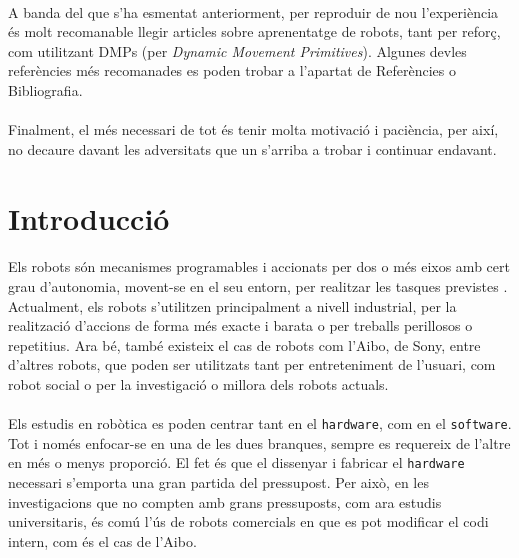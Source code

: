 \documentclass[12pt,a4paper,final,twoside]{article}
\begin{document}
\paragraph{}A banda del que s'ha esmentat anteriorment, per reproduir de nou l'experiència és molt recomanable llegir articles sobre aprenentatge de robots, tant per reforç, com utilitzant DMPs (per \textit{Dynamic Movement Primitives}). Algunes devles referències més recomanades es poden trobar a l'apartat de Referències o Bibliografia.

\paragraph{}Finalment, el més necessari de tot és tenir molta motivació i paciència, per així, no decaure davant les adversitats que un s'arriba a trobar i continuar endavant.

\newpage
\label{Introduccio}
\section{Introducció}

\paragraph{}Els robots són mecanismes programables i accionats per dos o més eixos amb cert grau d'autonomia, movent-se en el seu entorn, per realitzar les tasques previstes \cite{ISO_Robot}. Actualment, els robots s'utilitzen principalment a nivell industrial, per la realització d'accions de forma més exacte i barata o per treballs perillosos o repetitius. Ara bé, també existeix el cas de robots com l'Aibo, de Sony, entre d'altres robots, que poden ser utilitzats tant per entreteniment de l'usuari, com robot social o per la investigació o millora dels robots actuals.

\paragraph{}Els estudis en robòtica es poden centrar tant en el \texttt{hardware}, com en el \texttt{software}. Tot i només enfocar-se en una de les dues branques, sempre es requereix de l'altre en més o menys proporció. El fet és que el dissenyar i fabricar el \texttt{hardware} necessari s'emporta una gran partida del pressupost. Per això, en les investigacions que no compten amb grans pressuposts, com ara estudis universitaris, és comú l'ús de robots comercials en que es pot modificar el codi intern, com és el cas de l'Aibo.
\end{document}
